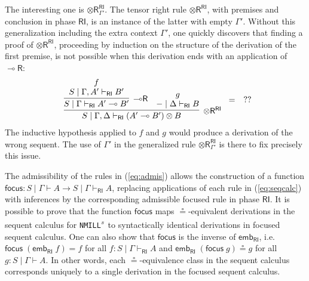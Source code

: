 \documentclass[submission,copyright,creativecommons]{eptcs}
\theoremstyle{definition}
\newcommand{\tr}{\otimes \mathsf{R}}
\newcommand{\lright}{{\multimap}\mathsf{R}}
\newcommand{\ot}{\otimes}
\newcommand{\lolli}{\multimap}
\newcommand{\RI}{\mathsf{RI}}
\newcommand{\proofbox}[1]{\begin{tabular}{l} #1 \end{tabular}}
\newcommand{\NMILL}{\texttt{NMILL}}
\newcommand{\SkNMILL}{\NMILL\textsuperscript{\textit{s}}}
\begin{document}
The interesting one is $\tr_{\Gamma'}^{\RI}$. The tensor right rule $\tr^\RI$, with premises and conclusion in phase $\RI$, is an instance of the latter with empty $\Gamma'$. 
Without this generalization including the extra context $\Gamma'$, one quickly discovers that finding a proof of $\tr^\RI$, proceeding by induction on the structure of the derivation of the first premise, is not possible when this derivation ends with an application of $\lright$:
\vspace{-.3cm}
\begin{displaymath}
  \proofbox{
    \infer[\tr^{\RI}]{S \mid \Gamma , \Delta \vdash_{\RI} (A' \lolli B') \ot B}{
    \infer[\lright]{S \mid \Gamma \vdash_{\RI} A' \lolli B'}{
      \deduce{S \mid \Gamma , A' \vdash_{\RI} B'}{f}
    }
    &
    \deduce{- \mid \Delta \vdash_{\RI} B}{g}
    }
    } = \quad ??
\end{displaymath}
The inductive hypothesis applied to $f$ and $g$ would produce a derivation of the wrong sequent. The use of $\Gamma'$ in the generalized rule $\tr_{\Gamma'}^{\RI}$ is there to fix precisely this issue.

The admissibility of the rules in (\ref{eq:admis}) allows the construction of a function $\mathsf{focus} : S \mid \Gamma \vdash A \to S \mid \Gamma \vdash_\RI A$, replacing applications of each rule in (\ref{eq:seqcalc}) with inferences by the corresponding admissible focused rule in phase $\RI$.
It is possible to prove that the function $\mathsf{focus}$ maps  $\circeq$-equivalent derivations in the sequent calculus for \SkNMILL\ to syntactically identical derivations in focused sequent calculus. One can also show that $\mathsf{focus}$ is the inverse of $\mathsf{emb}_\RI$, i.e. $\mathsf{focus}\;(\mathsf{emb}_\RI \;f) = f$ for all $f : S \mid \Gamma \vdash_\RI A$ and $\mathsf{emb}_\RI\;(\mathsf{focus}\;g) \circeq g$ for all $g : S \mid \Gamma \vdash A$. In other words, each $\circeq$-equivalence class in the sequent calculus corresponds uniquely to a single derivation in the focused sequent calculus.
\end{document}

